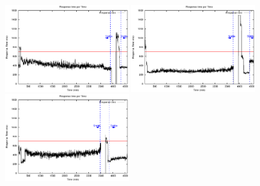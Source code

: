 


\setcounter{figure}{6}

\begin{figure}[htb]
	\begin{minipage}[b]{0.19\linewidth}
		\vspace{-3mm}
		\includegraphics[width=\linewidth,height=3.8cm]{images/exps2011/low/das/proxyDataPoints_output.eps}	
	\end{minipage}
\begin{minipage}[b]{0.19\linewidth}
		\vspace{-3mm}
		\includegraphics[width=\linewidth,height=3.8cm]{images/exps2011/medium_down/das/proxyDataPoints_output.eps}
	\end{minipage}
	\begin{minipage}[b]{0.19\linewidth}
		\vspace{-3mm}
		\includegraphics[width=\linewidth,height=3.8cm]{images/exps2011/medium/das/proxyDataPoints_output.eps}

\end{minipage}
\end{figure}

